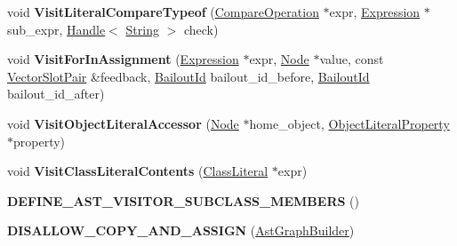 \begin{DoxyCompactItemize}
\item 
void {\bfseries Visit\+Literal\+Compare\+Typeof} (\hyperlink{classv8_1_1internal_1_1_compare_operation}{Compare\+Operation} $\ast$expr, \hyperlink{classv8_1_1internal_1_1_expression}{Expression} $\ast$sub\+\_\+expr, \hyperlink{classv8_1_1internal_1_1_handle}{Handle}$<$ \hyperlink{classv8_1_1internal_1_1_string}{String} $>$ check)\hypertarget{classv8_1_1internal_1_1compiler_1_1_ast_graph_builder_a864982e13de04ebe08f8f8f5a05e6166}{}\label{classv8_1_1internal_1_1compiler_1_1_ast_graph_builder_a864982e13de04ebe08f8f8f5a05e6166}

\item 
void {\bfseries Visit\+For\+In\+Assignment} (\hyperlink{classv8_1_1internal_1_1_expression}{Expression} $\ast$expr, \hyperlink{classv8_1_1internal_1_1compiler_1_1_node}{Node} $\ast$value, const \hyperlink{classv8_1_1internal_1_1compiler_1_1_vector_slot_pair}{Vector\+Slot\+Pair} \&feedback, \hyperlink{classv8_1_1internal_1_1_bailout_id}{Bailout\+Id} bailout\+\_\+id\+\_\+before, \hyperlink{classv8_1_1internal_1_1_bailout_id}{Bailout\+Id} bailout\+\_\+id\+\_\+after)\hypertarget{classv8_1_1internal_1_1compiler_1_1_ast_graph_builder_a69c909c417adc1fd2739c1a7ddabdebf}{}\label{classv8_1_1internal_1_1compiler_1_1_ast_graph_builder_a69c909c417adc1fd2739c1a7ddabdebf}

\item 
void {\bfseries Visit\+Object\+Literal\+Accessor} (\hyperlink{classv8_1_1internal_1_1compiler_1_1_node}{Node} $\ast$home\+\_\+object, \hyperlink{classv8_1_1internal_1_1_object_literal_property}{Object\+Literal\+Property} $\ast$property)\hypertarget{classv8_1_1internal_1_1compiler_1_1_ast_graph_builder_a46ff4b4b05482198df695399e0f442f7}{}\label{classv8_1_1internal_1_1compiler_1_1_ast_graph_builder_a46ff4b4b05482198df695399e0f442f7}

\item 
void {\bfseries Visit\+Class\+Literal\+Contents} (\hyperlink{classv8_1_1internal_1_1_class_literal}{Class\+Literal} $\ast$expr)\hypertarget{classv8_1_1internal_1_1compiler_1_1_ast_graph_builder_a8f43ecb3c9591d4ff4294d65980f6e7e}{}\label{classv8_1_1internal_1_1compiler_1_1_ast_graph_builder_a8f43ecb3c9591d4ff4294d65980f6e7e}

\item 
{\bfseries D\+E\+F\+I\+N\+E\+\_\+\+A\+S\+T\+\_\+\+V\+I\+S\+I\+T\+O\+R\+\_\+\+S\+U\+B\+C\+L\+A\+S\+S\+\_\+\+M\+E\+M\+B\+E\+RS} ()\hypertarget{classv8_1_1internal_1_1compiler_1_1_ast_graph_builder_ad00161d94c4c7d3f2ee373e4759d0ae6}{}\label{classv8_1_1internal_1_1compiler_1_1_ast_graph_builder_ad00161d94c4c7d3f2ee373e4759d0ae6}

\item 
{\bfseries D\+I\+S\+A\+L\+L\+O\+W\+\_\+\+C\+O\+P\+Y\+\_\+\+A\+N\+D\+\_\+\+A\+S\+S\+I\+GN} (\hyperlink{classv8_1_1internal_1_1compiler_1_1_ast_graph_builder}{Ast\+Graph\+Builder})\hypertarget{classv8_1_1internal_1_1compiler_1_1_ast_graph_builder_a7cb73a2d70cfb908725635a3086f57dd}{}\label{classv8_1_1internal_1_1compiler_1_1_ast_graph_builder_a7cb73a2d70cfb908725635a3086f57dd}

\end{DoxyCompactItemize}
